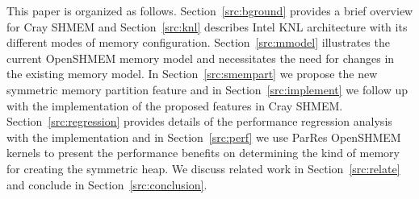 This paper is organized as follows.
Section~\ref{src:bground} provides a brief overview for Cray SHMEM
and Section~\ref{src:knl} describes Intel KNL architecture with its
different modes of memory configuration. Section~\ref{src:mmodel}
illustrates the current OpenSHMEM memory model and necessitates the need
for changes in the existing memory model. In Section~\ref{src:smempart}
we propose the new symmetric memory partition feature and in
Section~\ref{src:implement} we follow up with
the implementation of the proposed features in Cray SHMEM.
Section~\ref{src:regression} provides details of the performance
regression analysis with the implementation and in
Section~\ref{src:perf}
we use ParRes OpenSHMEM kernels to present the performance benefits on
determining the kind of memory for creating the symmetric heap. We
discuss related work in Section~\ref{src:relate} and conclude in
Section~\ref{src:conclusion}.
